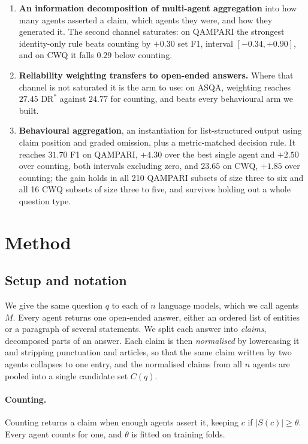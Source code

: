 \documentclass{article}
\begin{document}
\begin{enumerate}
\item \textbf{An information decomposition of multi-agent aggregation} into how many
agents asserted a claim, which agents they were, and how they generated it. The second
channel saturates: on QAMPARI the strongest identity-only rule beats counting by
$+0.30$ set F1, interval $[-0.34, +0.90]$, and on CWQ it falls $0.29$ below counting.

\item \textbf{Reliability weighting transfers to open-ended answers.} Where that
channel is not saturated it is the arm to use: on ASQA, weighting reaches $27.45$
$\mathrm{DR}^*$ against $24.77$ for counting, and beats every behavioural arm we
built.

\item \textbf{Behavioural aggregation}, an instantiation for list-structured output
using claim position and graded omission, plus a metric-matched decision rule. It
reaches $31.70$ F1 on QAMPARI, $+4.30$ over the best single agent and $+2.50$ over
counting, both intervals excluding zero, and $23.65$ on CWQ, $+1.85$ over counting; the
gain holds in all 210 QAMPARI subsets of size three to six and all 16 CWQ subsets of
size three to five, and survives holding out a whole question type.
\end{enumerate}

\section{Method}
\label{sec:method}

\subsection{Setup and notation}
\label{sec:setup}

We give the same question $q$ to each of $n$ language models, which we call agents $M$. Every agent returns one open-ended answer, either an ordered list of entities
or a paragraph of several statements. We split each answer into \emph{claims}, decomposed
parts of an answer. Each claim is then
\emph{normalised} by lowercasing it and stripping punctuation and articles, so that the
same claim written by two agents collapses to one entry, and the normalised claims from
all $n$ agents are pooled into a single candidate set $C(q)$.

\paragraph{Counting.}
Counting returns a claim when enough agents assert it, keeping $c$ if
$|S(c)| \geq \theta$. Every agent counts for one, and $\theta$ is fitted on training
folds.
\end{document}
